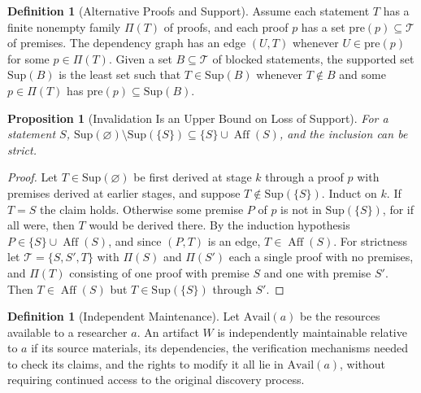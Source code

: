 \documentclass[11pt,letterpaper]{report}
\theoremstyle{plain}
\newtheorem{proposition}[theorem]{Proposition}
\theoremstyle{definition}
\newtheorem{definition}[theorem]{Definition}
\theoremstyle{remark}
\begin{document}
\begin{definition}[Alternative Proofs and Support]\label{def:support}
Assume each statement $T$ has a finite nonempty family $\Pi(T)$ of proofs, and each proof $p$ has a set $\mathrm{pre}(p)\subseteq\mathcal T$ of premises. The dependency graph has an edge $(U,T)$ whenever $U\in\mathrm{pre}(p)$ for some $p\in\Pi(T)$. Given a set $B\subseteq\mathcal T$ of blocked statements, the supported set $\mathrm{Sup}(B)$ is the least set such that $T\in\mathrm{Sup}(B)$ whenever $T\notin B$ and some $p\in\Pi(T)$ has $\mathrm{pre}(p)\subseteq\mathrm{Sup}(B)$.
\end{definition}

\begin{proposition}[Invalidation Is an Upper Bound on Loss of Support]\label{pr:lossbound}
For a statement $S$, $\mathrm{Sup}(\varnothing)\setminus\mathrm{Sup}(\{S\})\subseteq\{S\}\cup\operatorname{Aff}(S)$, and the inclusion can be strict.
\end{proposition}
\begin{proof}
Let $T\in\mathrm{Sup}(\varnothing)$ be first derived at stage $k$ through a proof $p$ with premises derived at earlier stages, and suppose $T\notin\mathrm{Sup}(\{S\})$. Induct on $k$. If $T=S$ the claim holds. Otherwise some premise $P$ of $p$ is not in $\mathrm{Sup}(\{S\})$, for if all were, then $T$ would be derived there. By the induction hypothesis $P\in\{S\}\cup\operatorname{Aff}(S)$, and since $(P,T)$ is an edge, $T\in\operatorname{Aff}(S)$. For strictness let $\mathcal T=\{S,S',T\}$ with $\Pi(S)$ and $\Pi(S')$ each a single proof with no premises, and $\Pi(T)$ consisting of one proof with premise $S$ and one with premise $S'$. Then $T\in\operatorname{Aff}(S)$ but $T\in\mathrm{Sup}(\{S\})$ through $S'$.
\end{proof}

\begin{definition}[Independent Maintenance]\label{def:indepmaint}
Let $\mathrm{Avail}(a)$ be the resources available to a researcher $a$. An artifact $W$ is independently maintainable relative to $a$ if its source materials, its dependencies, the verification mechanisms needed to check its claims, and the rights to modify it all lie in $\mathrm{Avail}(a)$, without requiring continued access to the original discovery process.
\end{definition}
\end{document}

